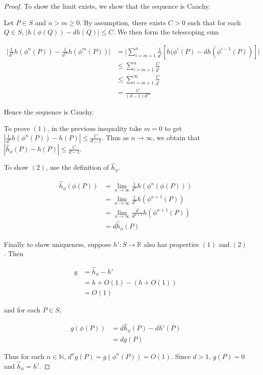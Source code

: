 \documentclass{amsart}
\newcommand{\R}{\mathbb{R}}
\newcommand{\N}{\mathbb{N}}
\begin{document}
\begin{proof}
To show the limit exists, we show that the sequence is Cauchy. 

Let $P \in S$ and $n>m \geq 0$. By assumption, there exists $C > 0 $ such that for each $Q \in S$, $|h(\phi(Q)) - dh(Q)| \leq C$. We then form the telescoping sum 

\begin{align*}
\bigg|\frac{1}{d^n} h(\phi^n(P)) - \frac{1}{d^m} h(\phi^m(P))\bigg|&= \bigg|\sum_{i = m+1}^n \frac{1}{d^i}[h(\phi^i(P)-dh(\phi^{i-1}(P))]\bigg| \\
&\leq \sum_{i = m+1}^n \frac{C}{d^i} \\
&\leq \sum_{i = m+1}^{\infty} \frac{C}{d^i}\\
&= \frac{C}{(d-1)d^m}
\end{align*}

Hence the sequence is Cauchy.

To prove $(1)$, in the previous inequality take $m=0$ to get $|\frac{1}{d^n} h(\phi^n(P)) - h(P)| \leq \frac{C}{d-1}$. Thus as $n \rightarrow \infty$, we obtain that 
$|\hat{h}_\phi(P) - h(P)| \leq \frac{C}{d-1}$.

To show $(2)$, use the definition of $\hat{h}_\phi.$

\begin{align*}
\hat{h}_\phi(\phi(P)) 
&= \lim_{n \rightarrow \infty}\frac{1}{d^n}h(\phi^n(\phi(P)))\\
&= \lim_{n \rightarrow \infty}\frac{1}{d^n}h(\phi^{n+1}(P))\\
&= \lim_{n \rightarrow \infty}\frac{d}{d^{n+1}}h(\phi^{n+1}(P))\\
&= d\hat{h}_\phi(P)
\end{align*}

Finally to show uniqueness, suppose $h':S \rightarrow \R$ also has properties $(1)$ and $(2)$. Then 

\begin{align*}
g
&=\hat{h}_\phi-h' \\
&= h + O(1) -(h+O(1))\\
&= O(1)
\end{align*}

\noindent and for each $P \in S$,

\begin{align*}
g(\phi(P)) 
&= d\hat{h}_\phi(P) - dh'(P)\\
&=dg(P)
\end{align*}

Thus for each $n \in \N$, $d^ng(P) = g(\phi^n(P))= O(1)$.
Since $d > 1$, $g(P)=0$ and $\hat{h}_\phi = h'$.

\end{proof}
\end{document}
